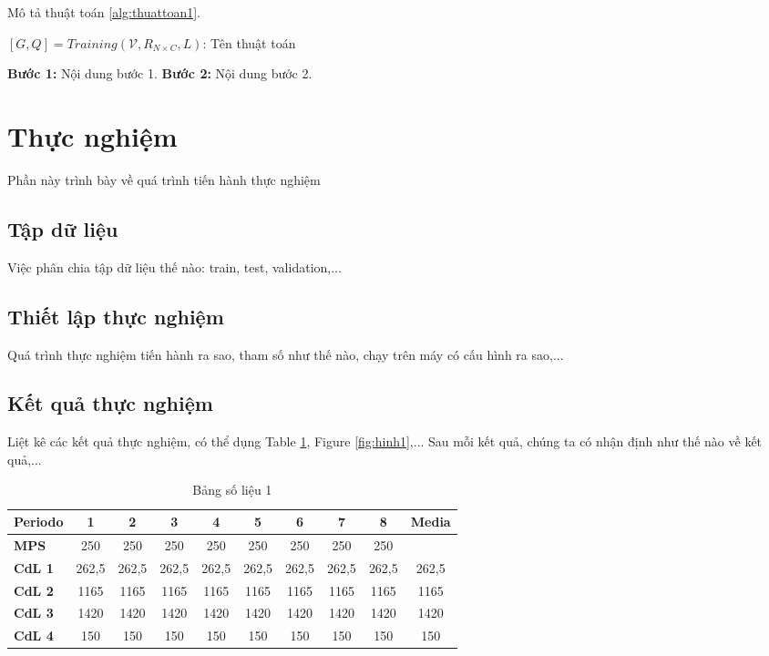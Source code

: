 \documentclass{FR16}
\makeatletter
\newenvironment{megaalgorithm}[1][htb]{%
    \renewcommand{\ALG@name}{\textbf{Thuật toán}}%
   \begin{algorithm}[#1]%
  }{\end{algorithm}}
\makeatother
\begin{document}
\newpage
Mô tả thuật toán \ref{alg:thuattoan1}.

\begin{megaalgorithm}
  	\caption{$[G, Q] = Training(\mathcal{V}, R_{N \times C}, L)$: Tên thuật toán}\label{alg:thuattoan1}
  	\begin{algorithmic}[1]
  	\show\LOOP
  		\State \textbf{Bước 1:} Nội dung bước 1.
  		\State \textbf{Bước 2:} Nội dung bước 2.

	\end{algorithmic}
\end{megaalgorithm}


\newpage
\section{Thực nghiệm}
Phần này trình bày về quá trình tiến hành thực nghiệm
\subsection{Tập dữ liệu}
Việc phân chia tập dữ liệu thế nào: train, test, validation,...
\subsection{Thiết lập thực nghiệm}
Quá trình thực nghiệm tiến hành ra sao, tham số như thế nào, chạy trên máy có cấu hình ra sao,...
\subsection{Kết quả thực nghiệm}
Liệt kê các kết quả thực nghiệm, có thể dụng Table \ref{tab:bang1}, Figure \ref{fig:hinh1},... Sau mỗi kết quả, chúng ta có nhận định như thế nào về kết quả,...

\begin{table}[]
    \centering

    \begin{tabular}{l c c c c c c c c c}
    \arrayrulecolor{Azzurro}
    \hline
    {\bfseries Periodo} & 1 & 2 & 3 & 4 & 5 & 6 & 7 & 8 & Media\\
    \hline
    {\bfseries MPS} & 250 & 250 & 250 & 250 & 250 & 250 & 250 & 250 & \\
    {\bfseries CdL 1} & 262,5 & 262,5 & 262,5 & 262,5 & 262,5 & 262,5 & 262,5 & 262,5 & 262,5\\
    {\bfseries CdL 2} & 1165 & 1165 & 1165 & 1165 & 1165 & 1165 & 1165 & 1165 & 1165\\
    {\bfseries CdL 3} & 1420 & 1420 & 1420 & 1420 & 1420 & 1420 & 1420 & 1420 & 1420\\
    {\bfseries CdL 4} & 150 & 150 & 150 & 150 & 150 & 150 & 150 & 150 & 150\\
    \hline
    \end{tabular}
    \caption{Bảng số liệu 1}
    \label{tab:bang1}
\end{table}
\end{document}
